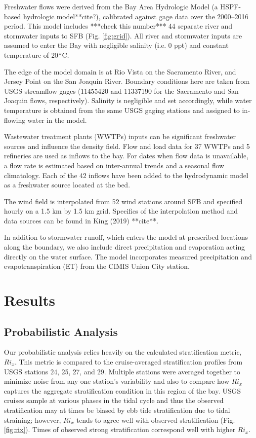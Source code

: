 \documentclass[preprint,review,12pt]{elsarticle}
\begin{document}
Freshwater flows were derived from the Bay Area Hydrologic Model (a HSPF-based hydrologic model**cite?), calibrated against gage data over the 2000–2016 period. This model includes ***check this number*** 44 separate river and stormwater inputs to SFB (Fig. \ref{fig:grid}). All river and stormwater inputs are assumed to enter the Bay with negligible salinity (i.e. 0 ppt) and constant temperature of 20\(\degree\)C.

The edge of the model domain is at Rio Vista on the Sacramento River, and Jersey Point on the San Joaquin River. Boundary conditions here are taken from USGS streamflow gages (11455420 and 11337190 for the Sacramento and San Joaquin flows, respectively). Salinity is negligible and set accordingly, while water temperature is obtained from the same USGS gaging stations and assigned to in-flowing water in the model. 

Wastewater treatment plants (WWTPs) inputs can be significant freshwater sources and influence the density field. Flow and load data for 37 WWTPs and 5 refineries are used as inflows to the bay. For dates when flow data is unavailable, a flow rate is estimated based on inter-annual trends and a seasonal flow climatology. Each of the 42 inflows have been added to the hydrodynamic model as a freshwater source located at the bed.

The wind field is interpolated from 52 wind stations around SFB and specified hourly on a 1.5 km by 1.5 km grid. Specifics of the interpolation method and data sources can be found in King (2019) **cite**. 

In addition to stormwater runoff, which enters the model at prescribed locations along the boundary, we also include direct precipitation and evaporation acting directly on the water surface. The model incorporates measured precipitation and evapotranspiration (ET\degree) from the CIMIS Union City station. 

\section{Results}\label{S:results}

\subsection{Probabilistic Analysis}
Our probabilistic analysis relies heavily on the calculated stratification metric, \(Ri_x\). This metric is compared to the cruise-averaged stratification profiles from USGS stations 24, 25, 27, and 29. Multiple stations were averaged together to minimize noise from any one station's variability and also to compare how \(Ri_x\) captures the aggregate stratification condition in this region of the bay. USGS cruises sample at various phases in the tidal cycle and thus the observed stratification may at times be biased by ebb tide stratification due to tidal straining; however, \(Ri_x\) tends to agree well with observed stratification (Fig. \ref{fig:rix}). Times of observed strong stratification correspond well with higher \(Ri_x\).
\end{document}

